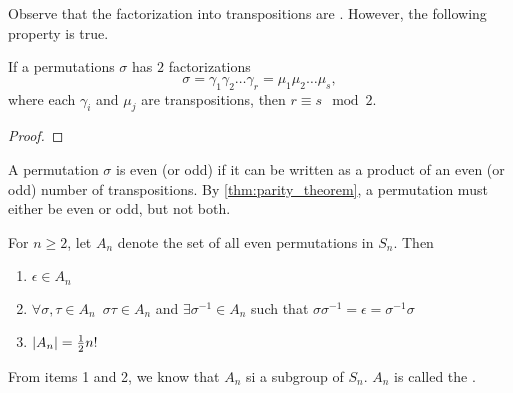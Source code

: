 \documentclass[notoc,notitlepage]{tufte-book}
\begin{document}
Observe that the factorization into transpositions are . However, the following property is true.

\begin{thm}\label{thm:parity_theorem}
  If a permutations $\sigma$ has $2$ factorizations
  \begin{equation*}
    \sigma = \gamma_1 \gamma_2 \hdots \gamma_r = \mu_1 \mu_2 \hdots \mu_s,
  \end{equation*}
  where each $\gamma_i$ and $\mu_j$ are transpositions, then $r \equiv s \mod 2$.
\end{thm}

\begin{proof}
\end{proof}

\begin{defn}\label{defn:odd_and_even_permutations}
  A permutation $\sigma$ is even (or odd) if it can be written as a product of an even (or odd) number of transpositions. By \autoref{thm:parity_theorem}, a permutation must either be even or odd, but not both.
\end{defn}

\begin{thm}\label{thm:alternating_group}
  For $n \geq 2$, let $A_n$ denote the set of all even permutations in $S_n$. Then
  \begin{enumerate}
    \item $\epsilon \in A_n$
    \item $\forall \sigma, \tau \in A_n \enspace \sigma \tau \in A_n$ and $\exists \sigma^{-1} \in A_n$ such that $\sigma \sigma^{-1} = \epsilon = \sigma^{-1} \sigma$
    \item $\left|A_n\right| = \frac{1}{2} n!$
  \end{enumerate}
\end{thm}

\begin{note}
  From items 1 and 2, we know that $A_n$ si a subgroup of $S_n$. $A_n$ is called the .
\end{note}
\end{document}
